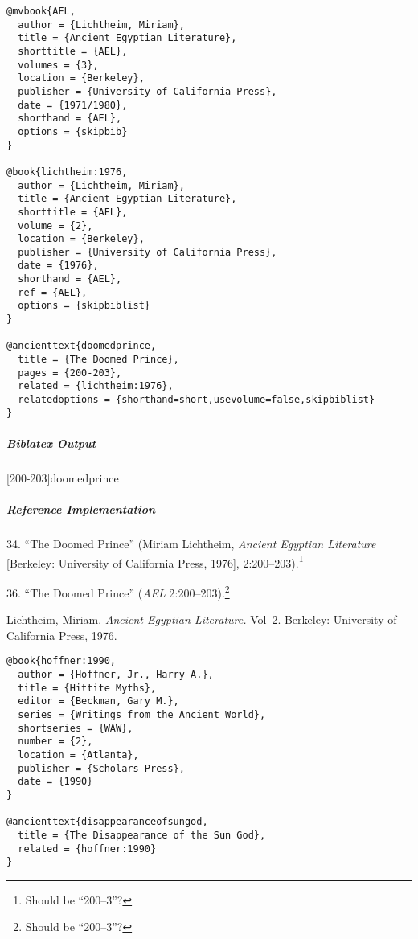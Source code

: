 \documentclass[a4paper]{article}
\newenvironment{biboutput}{%
  \subparagraph{Biblatex Output}
}{\color{black}}
\newenvironment{refimp}{%
  \subparagraph{Reference Implementation}
  \color{reference-colour}
  \rm
}{\par\color{black}}
\begin{document}
\medskip

\begin{lstlisting}
@mvbook{AEL,
  author = {Lichtheim, Miriam},
  title = {Ancient Egyptian Literature},
  shorttitle = {AEL},
  volumes = {3},
  location = {Berkeley},
  publisher = {University of California Press},
  date = {1971/1980},
  shorthand = {AEL},
  options = {skipbib}
}

@book{lichtheim:1976,
  author = {Lichtheim, Miriam},
  title = {Ancient Egyptian Literature},
  shorttitle = {AEL},
  volume = {2},
  location = {Berkeley},
  publisher = {University of California Press},
  date = {1976},
  shorthand = {AEL},
  ref = {AEL},
  options = {skipbiblist}
}

@ancienttext{doomedprince,
  title = {The Doomed Prince},
  pages = {200-203},
  related = {lichtheim:1976},
  relatedoptions = {shorthand=short,usevolume=false,skipbiblist}
}
\end{lstlisting}

\begin{biboutput}
  [200-203]{doomedprince}
\end{biboutput}

\begin{refimp}
  \hspace*{\bibindent}34. “The Doomed Prince” (Miriam Lichtheim, \emph{Ancient
  Egyptian Literature} [Berkeley: University of California Press, 1976],
  2:200–203).\footnote{Should be “200–3”?}
  
  \hspace*{\bibindent}36. “The Doomed Prince” (\emph{AEL}
  2:200–203).\footnote{Should be “200–3”?}
  
  \hangindent \bibindent Lichtheim, Miriam. \emph{Ancient Egyptian
  Literature.} Vol~2. Berkeley: University of California Press, 1976.

\end{refimp}

\medskip

\begin{lstlisting}
@book{hoffner:1990,
  author = {Hoffner, Jr., Harry A.},
  title = {Hittite Myths},
  editor = {Beckman, Gary M.},
  series = {Writings from the Ancient World},
  shortseries = {WAW},
  number = {2},
  location = {Atlanta},
  publisher = {Scholars Press},
  date = {1990}
}

@ancienttext{disappearanceofsungod,
  title = {The Disappearance of the Sun God},
  related = {hoffner:1990}
}
\end{lstlisting}
\end{document}
